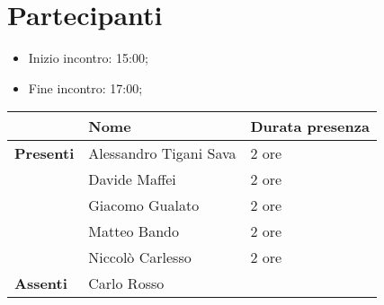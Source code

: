 \section{Partecipanti}

\begin{itemize}
    \item Inizio incontro: 15:00;
    \item Fine incontro: 17:00;
\end{itemize}


\begin{center}
	{\renewcommand{\arraystretch}{1.5}
	\begin{tabular}{lll}
							& \textbf{Nome}  & \textbf{Durata presenza} \\
		\hline
		\textbf{Presenti}   & Alessandro Tigani Sava 	& 2 ore     \\
							& Davide Maffei				& 2 ore		\\
							& Giacomo Gualato			& 2 ore		\\
							& Matteo Bando				& 2 ore		\\
							& Niccolò Carlesso			& 2 ore		\\
		\hline
		\textbf{Assenti}	& Carlo Rosso				& 			\\
	\end{tabular}	
	}
	\end{center}